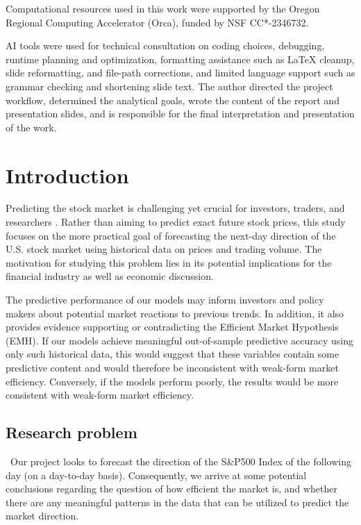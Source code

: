 \documentclass[11pt]{article}
\begin{document}
Computational resources used in this work were supported by the Oregon Regional Computing Accelerator (Orca), funded by NSF CC*-2346732.

AI tools were used for technical consultation on coding choices, debugging, runtime planning and optimization, formatting assistance such as LaTeX cleanup, slide reformatting, and file-path corrections, and limited language support such as grammar checking and shortening slide text. The author directed the project workflow, determined the analytical goals, wrote the content of the report and presentation slides, and is responsible for the final interpretation and presentation of the work.

\newpage
\tableofcontents
\newpage      

\setcounter{page}{1}

\section{Introduction}

\quad Predicting the stock market is challenging yet crucial for investors, traders, and researchers \cite{LIN_2024}. Rather than aiming to predict exact future stock prices, this study focuses on the more practical goal of forecasting the next-day direction of the U.S. stock market using historical data on prices and trading volume. The motivation for studying this problem lies in its potential implications for the financial industry as well as economic discussion. 

The predictive performance of our models may inform investors and policy makers about potential market reactions to previous trends. In addition, it also provides evidence supporting or contradicting the Efficient Market Hypothesis (EMH). If our models achieve meaningful out-of-sample predictive accuracy using only such historical data, this would suggest that these variables contain some predictive content and would therefore be inconsistent with weak-form market efficiency. Conversely, if the models perform poorly, the results would be more consistent with weak-form market efficiency.

\subsection{Research problem}

\quad \ Our project looks to forecast the direction of the S\&P500 Index of the following day (on a day-to-day basis). Consequently, we arrive at some potential conclusions regarding the question of how efficient the market is, and whether there are any meaningful patterns in the data that can be utilized to predict the market direction.
\end{document}
